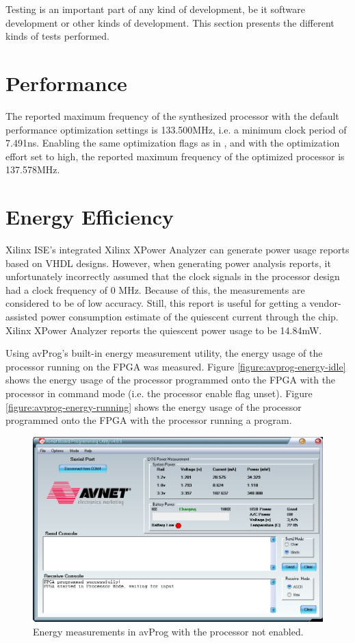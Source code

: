 Testing is an important part of any kind of development, be it software development or other kinds of development.
This section presents the different kinds of tests performed.

\section{Performance}

The reported maximum frequency of the synthesized processor with the default performance optimization settings is 133.500MHz, i.e. a minimum clock period of 7.491ns.
Enabling the same optimization flags as in \cite{assignment-1}, and with the optimization effort set to high, the reported maximum frequency of the optimized processor is 137.578MHz.

\section{Energy Efficiency}
\label{results:energy-efficiency}

Xilinx ISE's integrated Xilinx XPower Analyzer can generate power usage reports based on VHDL designs.
However, when generating power analysis reports, it unfortunately incorrectly assumed that the clock signals in the processor design had a clock frequency of 0 MHz.
Because of this, the measurements are considered to be of low accuracy.
Still, this report is useful for getting a vendor-assisted power consumption estimate of the quiescent current through the chip.
Xilinx XPower Analyzer reports the quiescent power usage to be 14.84mW.

Using avProg's built-in energy measurement utility, the energy usage of the processor running on the FPGA was measured.
Figure \vref{figure:avprog-energy-idle} shows the energy usage of the processor programmed onto the FPGA with the processor in command mode (i.e. the processor enable flag unset).
Figure \vref{figure:avprog-energy-running} shows the energy usage of the processor programmed onto the FPGA with the processor running a program.

\begin{figure}[H]
\includegraphics[width=\textwidth]{illustrations/paused.PNG}
\caption{Energy measurements in avProg with the processor not enabled.}
\label{figure:avprog-energy-idle}
\end{figure}

